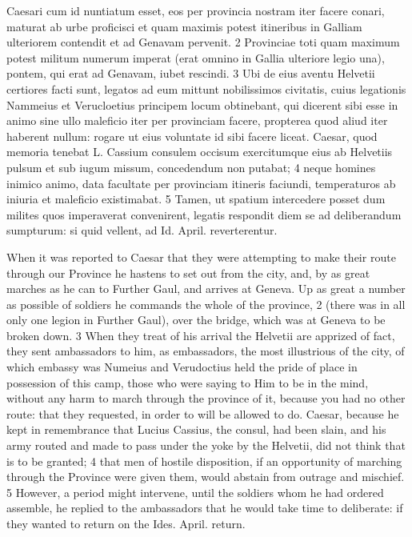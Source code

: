 \documentclass{article}
\begin{document}
\begin{multicols}{2}
Caesari cum id nuntiatum esset, eos per provincia nostram iter facere conari, maturat ab urbe proficisci et quam maximis potest itineribus in Galliam ulteriorem contendit et ad Genavam pervenit. 2 Provinciae toti quam maximum potest militum numerum imperat (erat omnino in Gallia ulteriore legio una), pontem, qui erat ad Genavam, iubet rescindi. 3 Ubi de eius aventu Helvetii certiores facti sunt, legatos ad eum mittunt nobilissimos civitatis, cuius legationis Nammeius et Verucloetius principem locum obtinebant, qui dicerent sibi esse in animo sine ullo maleficio iter per provinciam facere, propterea quod aliud iter haberent nullum: rogare ut eius voluntate id sibi facere liceat. Caesar, quod memoria tenebat L. Cassium consulem occisum exercitumque eius ab Helvetiis pulsum et sub iugum missum, concedendum non putabat; 4 neque homines inimico animo, data facultate per provinciam itineris faciundi, temperaturos ab iniuria et maleficio existimabat. 5 Tamen, ut spatium intercedere posset dum milites quos imperaverat convenirent, legatis respondit diem se ad deliberandum sumpturum: si quid vellent, ad Id. April. reverterentur. 

\vfill\null
\columnbreak
When it was reported to Caesar that they were attempting to make their route through our Province he hastens to set out from the city, and, by as great marches as he can to Further Gaul, and arrives at Geneva. Up as great a number as possible of soldiers he commands the whole of the province, 2 (there was in all only one legion in Further Gaul), over the bridge, which was at Geneva to be broken down. 3 When they treat of his arrival the Helvetii are apprized of fact, they sent ambassadors to him, as embassadors, the most illustrious of the city, of which embassy was Numeius and Verudoctius held the pride of place in possession of this camp, those who were saying to Him to be in the mind, without any harm to march through the province of it, because you had no other route: that they requested, in order to will be allowed to do. Caesar, because he kept in remembrance that Lucius Cassius, the consul, had been slain, and his army routed and made to pass under the yoke by the Helvetii, did not think that is to be granted; 4 that men of hostile disposition, if an opportunity of marching through the Province were given them, would abstain from outrage and mischief. 5 However, a period might intervene, until the soldiers whom he had ordered assemble, he replied to the ambassadors that he would take time to deliberate: if they wanted to return on the Ides. April. return.
\end{multicols}
\end{document}
